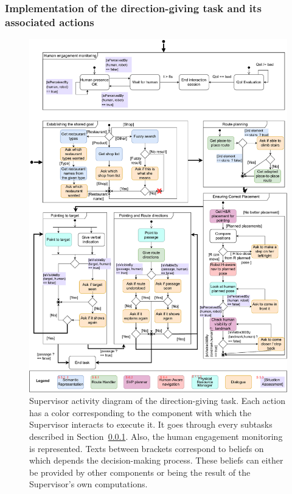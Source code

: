 \documentclass[a4paper,11pt,twoside]{StyleThese}
\begin{document}
\subsubsection{Implementation of the direction-giving task and its associated actions}\label{subsubsec:sup:subtasks}
\begin{figure}[hbtp]
	\centering
	\includegraphics[width=\linewidth]{figures/chapter3/state_machines.pdf}
	\caption{\label{fig:chap3_SM} Supervisor activity diagram of the direction-giving task. Each action has a color corresponding to the component with which the Supervisor interacts to execute it. It goes through every subtasks described in Section~\ref{subsubsec:sup:subtasks}. Also, the human engagement monitoring is represented. Texts between brackets correspond to beliefs on which depends the decision-making process. These beliefs can either be provided by other components or being the result of the Supervisor's own computations. }
\end{figure}
\end{document}
